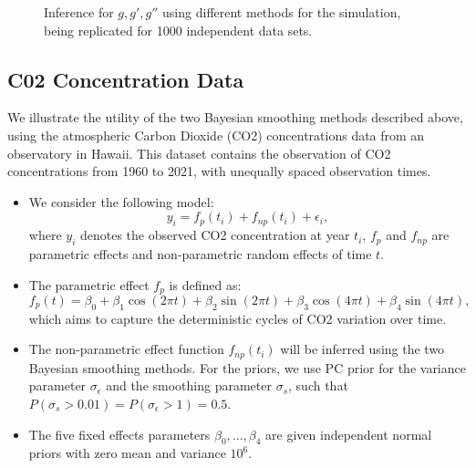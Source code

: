 \documentclass{beamer} %
\begin{document}
\begin{frame}
\begin{figure}[p]
{    }
    \caption{Inference for $g,g',g''$ using different methods for the simulation, being replicated for 1000 independent data sets.}
    \label{fig:sim1-1000replic}
\end{figure}


\end{frame}


\subsection{C02 Concentration Data}

\begin{frame}
We illustrate the utility of the two Bayesian smoothing methods described above, using the atmospheric Carbon Dioxide (CO2) concentrations data from an observatory in Hawaii. This dataset contains the observation of CO2 concentrations from 1960 to 2021, with unequally spaced observation times. 
\end{frame}


\begin{frame}
\begin{itemize}

\item We consider the following model: $$y_i = f_{p}(t_i) + f_{np}(t_i) + \epsilon_i,$$ where $y_i$ denotes the observed CO2 concentration at year $t_i$, $f_{p}$ and $f_{np}$ are parametric effects and non-parametric random effects of time $t$.

\pause
\item The parametric effect $f_{p}$ is defined as: $$f_{p}(t) = \beta_0 + \beta_1 \cos(2\pi t) + \beta_2 \sin(2 \pi t) + \beta_3 \cos(4\pi t) + \beta_4 \sin(4\pi t),$$ which aims to capture the deterministic cycles of CO2 variation over time.

\pause
\item The non-parametric effect function $f_{np}(t_i)$ will be inferred using the two Bayesian smoothing methods. For the priors, we use PC prior for the variance parameter $\sigma_\epsilon$ and the smoothing parameter $\sigma_s$, such that $P(\sigma_s > 0.01) = P(\sigma_\epsilon > 1) = 0.5$.

\pause
\item The five fixed effects parameters $\beta_0, ..., \beta_4$ are given independent normal priors with zero mean and variance $10^6$.  

\end{itemize}
\end{frame}
\end{document}
